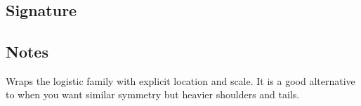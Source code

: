 \documentclass[letterpaper,10pt,english]{sphinxmanual}
\begin{document}
\section{}
\label{\detokenize{object_api_reference:logistic}}

\subsection{Signature}
\label{\detokenize{object_api_reference:id37}}
\begin{sphinxVerbatim}[commandchars=\\\{\}]

\end{sphinxVerbatim}


\subsection{Notes}
\label{\detokenize{object_api_reference:id38}}
\sphinxAtStartPar
Wraps the logistic family with explicit location and scale. It is a good alternative to  when you want similar symmetry but heavier shoulders and tails.
\end{document}
